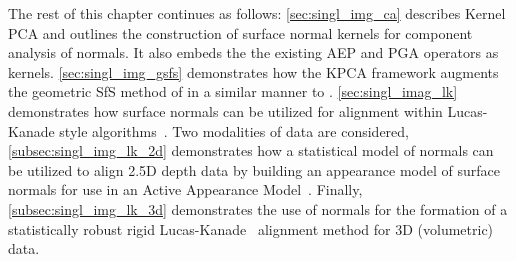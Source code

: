The rest of this chapter continues as follows:
\cref{sec:singl_img_ca} describes Kernel PCA and outlines the construction of
surface normal kernels for component analysis of normals. It also embeds the the
existing AEP and PGA operators as kernels.
\cref{sec:singl_img_gsfs} demonstrates how the KPCA framework augments
the geometric SfS method of \citet{worthington1999new} in a similar manner to
\citet{smith2006recovering}. \cref{sec:singl_imag_lk} demonstrates how surface
normals can be utilized for alignment within Lucas-Kanade style
algorithms~\cite{lucas1981iterative}. Two modalities of data are considered,
\cref{subsec:singl_img_lk_2d} demonstrates how a statistical model of normals can be
utilized to align 2.5D depth data by building an appearance model of surface
normals for use in an Active Appearance Model~\cite{cootes2001active}. Finally,
\cref{subsec:singl_img_lk_3d} demonstrates the use of normals for the formation of
a statistically robust rigid Lucas-Kanade~\cite{lucas1981iterative} alignment
method for 3D (volumetric) data.
{




}
\stopcontents[chapters]
